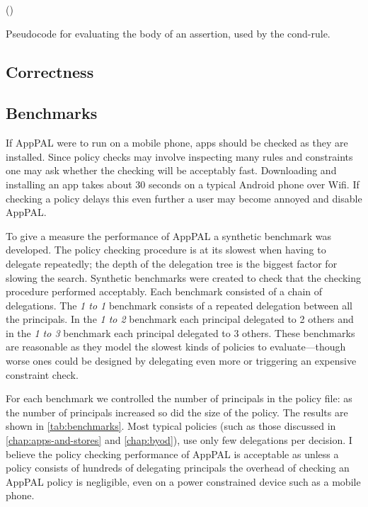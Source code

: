 \documentclass[thesis.tex]{subfiles}
\begin{document}
\begin{algorithm}
  \ContinuedFloat
  \Fn(){}{
  }
  \caption{Pseudocode for evaluating the body of an assertion, used by the cond-rule.}
\end{algorithm}



\subsection{Correctness}
\subsection{Benchmarks}
\label{ssec:benchmarks}

If AppPAL were to run on a mobile phone, apps should be checked as they are installed.
Since policy checks may involve inspecting many rules and constraints one may ask whether the checking will be acceptably fast.
Downloading and installing an app takes about 30 seconds on a typical Android phone over Wifi.
If checking a policy delays this even further a user may become annoyed and disable AppPAL.

To give a measure the performance of AppPAL a synthetic benchmark was developed.
The policy checking procedure is at its slowest when having to delegate repeatedly;
the depth of the delegation tree is the biggest factor for slowing the search.
Synthetic benchmarks were created to check that the checking procedure performed acceptably.
Each benchmark consisted of a chain of delegations.
The \emph{1 to 1} benchmark consists of a repeated delegation between all the principals.
In the \emph{1 to 2} benchmark each principal delegated to 2 others and in the \emph{1 to 3} benchmark each principal delegated to 3 others.
These benchmarks are reasonable as they model the slowest kinds of policies to
evaluate---though worse ones could be designed by delegating even more or triggering an expensive constraint check.

For each benchmark we controlled the number of principals in the policy file:
as the number of principals increased so did the size of the policy.
The results are shown in \autoref{tab:benchmarks}.
Most typical policies (such as those discussed in \autoref{chap:apps-and-stores} and \autoref{chap:byod}), use only few delegations per decision.
I believe the policy checking performance of AppPAL is acceptable as unless a policy consists of hundreds of delegating principals the overhead of checking an AppPAL policy is negligible, even on a power constrained device such as a mobile phone.
\end{document}
